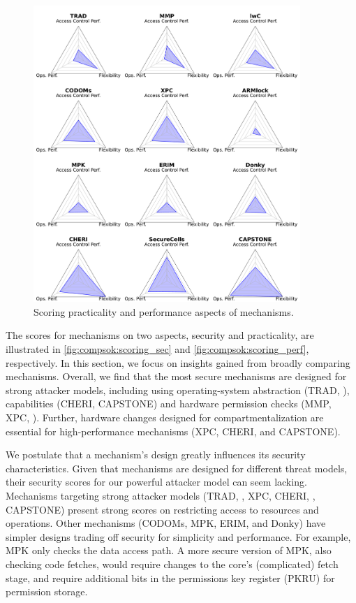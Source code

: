 \begin{figure}
  \centering
  \includegraphics[width=0.9\textwidth]{data/compsok/scoring_practicality.pdf}
  \caption[Scoring practicality and performance aspects of mechanisms.]
          {Scoring practicality and performance aspects of mechanisms.}
  \label{fig:compsok:scoring_perf}
\end{figure}

The scores for mechanisms on two aspects, security and practicality, 
are illustrated in 
\autoref{fig:compsok:scoring_sec} and \autoref{fig:compsok:scoring_perf},
respectively.
In this section, we focus on insights gained from broadly
comparing mechanisms.
Overall, we find that the most secure mechanisms are designed for strong
attacker models, including using
operating-system abstraction (TRAD, \lwc), capabilities (CHERI, CAPSTONE)
and hardware permission checks (MMP, XPC, \seccells).
Further, hardware changes designed for compartmentalization are essential for
high-performance mechanisms (XPC, CHERI, \seccells and CAPSTONE).

We postulate that a mechanism's design greatly influences its security
characteristics.
Given that mechanisms are designed for different threat models, their
security scores for our powerful attacker model can seem lacking.
Mechanisms targeting strong attacker 
models (TRAD, \lwc, XPC, CHERI, \seccells, CAPSTONE) 
present strong scores on restricting access to resources and operations.
Other mechanisms (CODOMs, MPK, ERIM, and Donky) have simpler designs
trading off security for simplicity and performance.
For example, MPK only checks the data access path. 
A more secure version of MPK, also checking code fetches, would require
changes to the core's (complicated) fetch stage, and require additional
bits in the permissions key register (PKRU) for permission storage.

